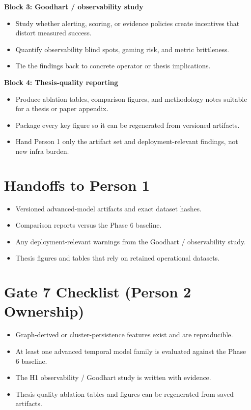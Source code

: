 \documentclass{article}
\begin{document}
\textbf{Block 3: Goodhart / observability study}
\begin{itemize}
\item Study whether alerting, scoring, or evidence policies create incentives that distort measured success.
\item Quantify observability blind spots, gaming risk, and metric brittleness.
\item Tie the findings back to concrete operator or thesis implications.
\end{itemize}

\textbf{Block 4: Thesis-quality reporting}
\begin{itemize}
\item Produce ablation tables, comparison figures, and methodology notes suitable for a thesis or paper appendix.
\item Package every key figure so it can be regenerated from versioned artifacts.
\item Hand Person 1 only the artifact set and deployment-relevant findings, not new infra burden.
\end{itemize}

\section*{Handoffs to Person 1}
\begin{itemize}
\item Versioned advanced-model artifacts and exact dataset hashes.
\item Comparison reports versus the Phase 6 baseline.
\item Any deployment-relevant warnings from the Goodhart / observability study.
\item Thesis figures and tables that rely on retained operational datasets.
\end{itemize}

\section*{Gate 7 Checklist (Person 2 Ownership)}
\begin{itemize}
\item Graph-derived or cluster-persistence features exist and are reproducible.
\item At least one advanced temporal model family is evaluated against the Phase 6 baseline.
\item The H1 observability / Goodhart study is written with evidence.
\item Thesis-quality ablation tables and figures can be regenerated from saved artifacts.
\end{itemize}
\end{document}

